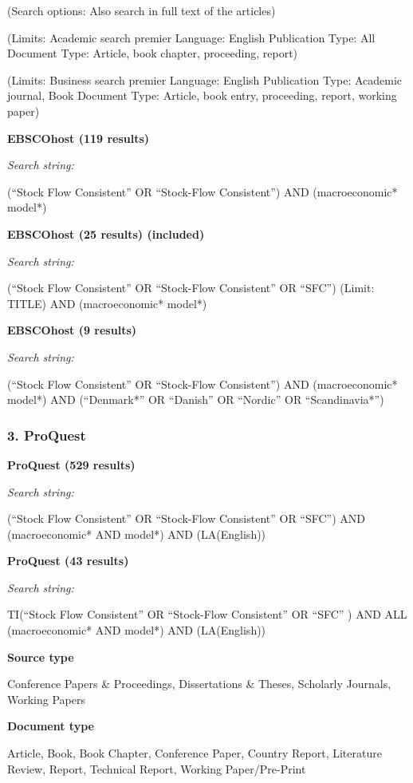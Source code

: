 \documentclass[
]{book}
\begin{document}
(Search options: Also search in full text of the articles)

(Limits: Academic search premier
Language: English
Publication Type: All
Document Type: Article, book chapter, proceeding, report)

(Limits: Business search premier
Language: English
Publication Type: Academic journal, Book
Document Type: Article, book entry, proceeding, report, working paper)

\textbf{EBSCOhost (119 results)}

\emph{Search string:}

(``Stock Flow Consistent'' OR ``Stock-Flow Consistent'')
AND
(macroeconomic* model*)

\textbf{EBSCOhost (25 results) (included)}

\emph{Search string:}

(``Stock Flow Consistent'' OR ``Stock-Flow Consistent'' OR ``SFC'') (Limit: TITLE)
AND
(macroeconomic* model*)

\textbf{EBSCOhost (9 results)}

\emph{Search string:}

(``Stock Flow Consistent'' OR ``Stock-Flow Consistent'')
AND
(macroeconomic* model*)
AND
(``Denmark*'' OR ``Danish'' OR ``Nordic'' OR ``Scandinavia*'')

\hypertarget{proquest}{%
\subsubsection{3. ProQuest}\label{proquest}}

\textbf{ProQuest (529 results)}

\emph{Search string:}

(``Stock Flow Consistent'' OR ``Stock-Flow Consistent'' OR ``SFC'') AND (macroeconomic* AND model*) AND (LA(English))

\textbf{ProQuest (43 results)}

\emph{Search string:}

TI(``Stock Flow Consistent'' OR ``Stock-Flow Consistent'' OR ``SFC'' ) AND ALL (macroeconomic* AND model*) AND (LA(English))

\textbf{Source type}

Conference Papers \& Proceedings, Dissertations \& Theses, Scholarly Journals, Working Papers

\textbf{Document type}

Article, Book, Book Chapter, Conference Paper, Country Report, Literature Review, Report, Technical Report, Working Paper/Pre-Print
\end{document}

